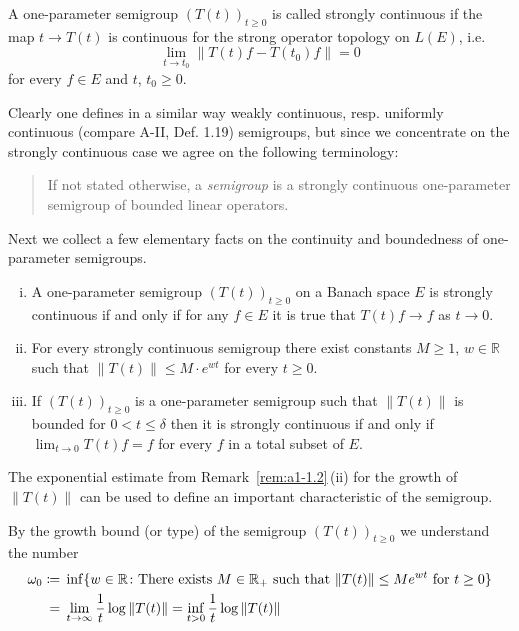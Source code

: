 \begin{definition}\label{def:a1-1.1}
A one-parameter semigroup $(T(t))_{t\geq0}$ is called strongly continuous if the map $t \to T(t)$ is continuous for the strong operator topology on $L(E)$, i.e. 
\[
	\lim_{t\to t_{0}} \|T(t)f - T(t_{0})f\| = 0
\]
for every $f \in E$ and $t$, $t_{0} \geq 0$.
\end{definition}
Clearly one defines in a similar way weakly continuous, resp. uniformly continuous (compare A-II, Def. 1.19) semigroups, but since we concentrate on the strongly continuous case we agree on the following terminology:
\begin{quote}
If not stated otherwise, a \emph{semigroup } is a strongly continuous one-parameter semigroup of bounded linear operators.
\end{quote}
Next we collect a few elementary facts on the continuity and boundedness of one-parameter semigroups.
\begin{remarks}\label{rem:a1-1.2}
\begin{enumerate}[(i), wide]

\item 
A one-parameter semigroup $(T(t))_{t \geq 0}$ on a Banach space $E$ is strongly continuous if and only if for any $f \in E$ it is true that $T(t)f \to f$ as $t \to 0$.

\item 
For every strongly continuous semigroup there exist constants $M \geq 1$, $w \in \mathbb{R}$ such that $\|T(t)\| \leq M \cdot e^{wt}$ for every $t \geq 0$.
\item If $(T(t))_{t\geq0}$ is a one-parameter semigroup such that $\|T(t)\|$ is bounded for $0 < t \leq \delta$ then it is strongly continuous if and only if $\lim_{t \to 0} T(t)f = f$ for every $f$ in a total subset of $E$.

\end{enumerate}
\end{remarks}
The exponential estimate from Remark~\ref{rem:a1-1.2}\,(ii) for the growth of $\|T(t)\|$ can be used to define an important characteristic of the semigroup.
\begin{definition}\label{def:a1-1.3}
By the growth bound (or type) of the semigroup $(T(t))_{t\geq0}$ we understand the number
\begin{align*}\label{eq:a1-1.1}
\omega_{0} \coloneqq{}& \inf\{w \in \mathbb{R} \colon \text{There exists } M \in \mathbb{R}_{+} \text{ such that } \|T(t)\| \leq Me^{wt} \text{ for } t \geq 0\} \\
={}& \lim_{t\to\infty} \frac{1}{t}\log\|T(t)\| = \inf_{t>0} \frac{1}{t}\log\|T(t)\| \notag
\end{align*}
\end{definition}
\newpage

